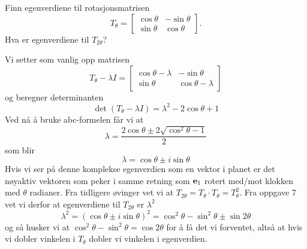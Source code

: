 \begin{oppgave}
Finn egenverdiene til rotasjonsmatrisen
\[
T_{\theta}=
\begin{bmatrix}
\cos \theta & -\sin \theta  \\ \sin \theta & \cos \theta  
\end{bmatrix}.
\]
Hva er egenverdiene til $T_{2 \theta}$?
\end{oppgave}


\begin{losning}
Vi setter som vanlig opp matrisen
\begin{equation*}
	T_\theta - \lambda I = 
	\begin{bmatrix}
	\cos \theta - \lambda & -\sin\theta \\
	\sin\theta & \cos\theta - \lambda
\end{bmatrix}
\end{equation*}
og beregner determinanten
\begin{equation*}
	\det(T_\theta - \lambda I) = \lambda^2 - 2\cos\theta + 1
\end{equation*}
Ved nå å bruke abc-formelen får vi at 
\begin{equation*}
	\lambda = \frac{2\cos\theta \pm 2\sqrt{\cos ^2\theta - 1}}{2}
\end{equation*}	
som blir
\begin{equation*}
	\lambda = \cos\theta \pm i\sin\theta
\end{equation*}
Hvis vi ser på denne komplekse egenverdien som en vektor i planet er det nøyaktiv vektoren som peker i samme retning som $\mathbf{e}_1$ rotert med/mot klokken med $\theta$ radianer. Fra tidligere øvinger vet vi at $T_{2\theta} = T_\theta\cdot T_\theta = T_\theta^2$. Fra oppgave 7 vet vi derfor at egenverdiene til  $T_{2\theta}$ er $\lambda^2$
\begin{equation*}
	\lambda^2 = (\cos\theta \pm i\sin\theta)^2 = \cos^2\theta - \sin^2\theta \pm \sin2\theta
\end{equation*}
og så husker vi at $\cos^2\theta - \sin^2\theta = \cos 2\theta$ for å få det vi forventet, altså at hvis vi dobler vinkelen i $T_\theta$ dobler vi vinkelen i egenverdien.
\end{losning}


